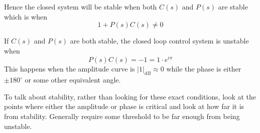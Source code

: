 \documentclass[11pt]{article}
\begin{document}
Hence the closed system will be stable when both \(C(s)\) and \(P(s)\) are stable which is when
$$
1 + P(s)C(s) \ne 0
$$

If \(C(s)\) and \(P(s)\) are both stable, the closed loop control system is unstable when
$$
P(s)C(s) = -1 = 1 \cdot e^{i\pi}
$$
This happens when the amplitude curve is \(|1|_{dB} \approx 0\) while the phase is either
\(\pm 180^{\circ}\) or some other equivalent angle.

To talk about stability, rather than looking for these exact conditions, look at the points
where either the amplitude or phase is critical and look at how far it is from stability.
Generally require some threshold to be far enough from being unstable.
\end{document}
